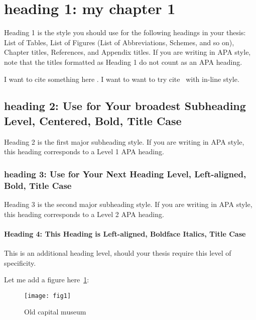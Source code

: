 \section{heading 1: my chapter 1}

Heading 1 is the style you should use for the following headings in your thesis: List of Tables, List of Figures (List of Abbreviations, Schemes, and so on), Chapter titles, References, and Appendix titles. If you are writing in APA style, note that the titles formatted as Heading 1 do not count as an APA heading.  

I want to cite something here \parencite{zuo2019standing}. I want to want to try cite~\textcite{zuo2019standing} with in-line style.

\subsection{heading 2: Use for Your broadest Subheading Level, Centered, Bold, Title Case}

Heading 2 is the first major subheading style. If you are writing in APA style, this heading corresponds to a Level 1 APA heading.  

\subsubsection{heading 3: Use for Your Next Heading Level, Left-aligned, Bold, Title Case}

Heading 3 is the second major subheading style. If you are writing in APA style, this heading corresponds to a Level 2 APA heading. 

\paragraph{Heading 4: This Heading is Left-aligned, Boldface Italics, Title Case}
This is an additional heading level, should your thesis require this level of specificity.

Let me add a figure here~\cref{fig:1}:
\begin{figure}[h]
    \centering
    \captionsetup{width=0.6\linewidth} %
    \caption{Old capital museum}
    \texttt{[image: fig1]}
    \label{fig:1}
\end{figure}
